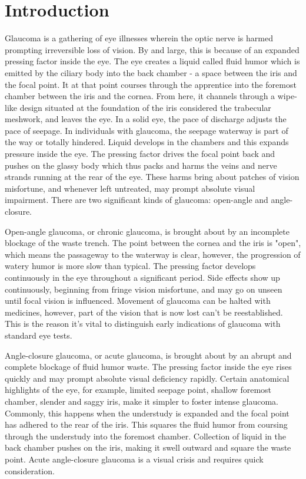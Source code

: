 \section{Introduction}
Glaucoma is a gathering of eye illnesses wherein the optic nerve is harmed prompting irreversible loss of vision. By and large, this is because of an expanded pressing factor inside the eye. The eye creates a liquid called fluid humor which is emitted by the ciliary body into the back chamber - a space between the iris and the focal point. It at that point courses through the apprentice into the foremost chamber between the iris and the cornea. From here, it channels through a wipe-like design situated at the foundation of the iris considered the trabecular meshwork, and leaves the eye. In a solid eye, the pace of discharge adjusts the pace of seepage. In individuals with glaucoma, the seepage waterway is part of the way or totally hindered. Liquid develops in the chambers and this expands pressure inside the eye. The pressing factor drives the focal point back and pushes on the glassy body which thus packs and harms the veins and nerve strands running at the rear of the eye. These harms bring about patches of vision misfortune, and whenever left untreated, may prompt absolute visual impairment. There are two significant kinds of glaucoma: open-angle and angle-closure.

\vspace{5mm}
\noindent Open-angle glaucoma, or chronic glaucoma, is brought about by an incomplete blockage of the waste trench. The point between the cornea and the iris is "open", which means the passageway to the waterway is clear, however, the progression of watery humor is more slow than typical. The pressing factor develops continuously in the eye throughout a significant period. Side effects show up continuously, beginning from fringe vision misfortune, and may go on unseen until focal vision is influenced. Movement of glaucoma can be halted with medicines, however, part of the vision that is now lost can't be reestablished. This is the reason it's vital to distinguish early indications of glaucoma with standard eye tests.

\vspace{5mm}
\noindent Angle-closure glaucoma, or acute glaucoma, is brought about by an abrupt and complete blockage of fluid humor waste. The pressing factor inside the eye rises quickly and may prompt absolute visual deficiency rapidly. Certain anatomical highlights of the eye, for example, limited seepage point, shallow foremost chamber, slender and saggy iris, make it simpler to foster intense glaucoma. Commonly, this happens when the understudy is expanded and the focal point has adhered to the rear of the iris. This squares the fluid humor from coursing through the understudy into the foremost chamber. Collection of liquid in the back chamber pushes on the iris, making it swell outward and square the waste point. Acute angle-closure glaucoma is a visual crisis and requires quick consideration.

